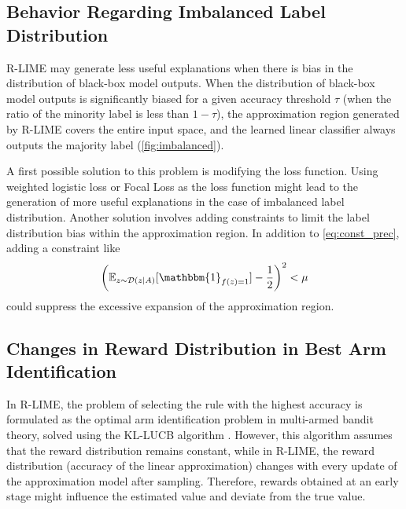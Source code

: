 \documentclass[11pt]{article}
\begin{document}
\subsection{Behavior Regarding Imbalanced Label Distribution}
R-LIME may generate less useful explanations
when there is bias in the distribution of black-box model outputs.
When the distribution of black-box model outputs is significantly biased
for a given accuracy threshold $\tau$
(when the ratio of the minority label is less than $1-\tau$),
the approximation region generated by R-LIME covers the entire input space,
and the learned linear classifier always outputs the majority label
(\cref{fig:imbalanced}).

A first possible solution to this problem is modifying the loss function.
Using weighted logistic loss or Focal Loss \cite{lin2020focal}
as the loss function might lead to the generation of more useful explanations
in the case of imbalanced label distribution.
Another solution involves adding constraints
to limit the label distribution bias within the approximation region.
In addition to \cref{eq:const_prec}, adding a constraint like
\begin{equation}
  {\left(\mathbb{E}_{z\sim\mathcal{D}(z\mid A)}[\mathbbm{1}_{f(z)=1}]-\frac{1}{2}\right)}^2<\mu
\end{equation}
could suppress the excessive expansion of the approximation region.

\subsection{Changes in Reward Distribution in Best Arm Identification}\label{sec:reward}
{%
  \renewcommand{\arraystretch}{1.1}
  \begin{table}[tbp]
    \centering
    \caption[Deviation between the estimated accuracy and the true accuracy]{%
      Deviation between the estimated accuracy and the true accuracy.
      Deviation was relatively small considering confidence level $1-\delta=0.95$.
    }\label{tab:reward}
    
  \end{table}
}
In R-LIME,
the problem of selecting the rule with the highest accuracy is formulated
as the optimal arm identification problem in multi-armed bandit theory,
solved using the KL-LUCB algorithm \cite{kaufmann2013information}.
However, this algorithm assumes that the reward distribution remains constant,
while in R-LIME,
the reward distribution (accuracy of the linear approximation)
changes with every update of the approximation model after sampling.
Therefore, rewards obtained at an early stage
might influence the estimated value and deviate from the true value.
\end{document}
